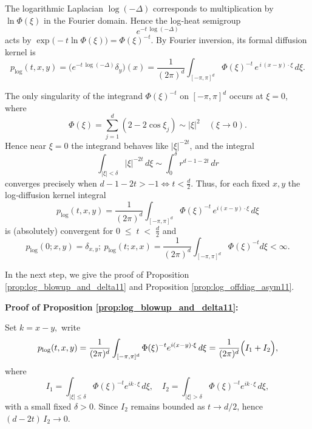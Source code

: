\documentclass[reqno,12pt]{amsart}
\numberwithin{equation}{section}
\begin{document}
The logarithmic Laplacian \(\log(-\Delta)\) corresponds to multiplication by \(\ln\Phi(\xi)\) in the Fourier domain.  Hence the log‐heat semigroup
\[
e^{-t\,\log(-\Delta)}
\]
acts by \(\exp\bigl(-t\ln\Phi(\xi)\bigr)=\Phi(\xi)^{-t}\).  By Fourier inversion, its formal diffusion kernel is
\[
p_{\log}(t,x,y)
=\bigl(e^{-t\,\log(-\Delta)}\delta_{y}\bigr)(x)
=\frac{1}{(2\pi)^d}
\int_{[-\pi,\pi]^d}
\Phi(\xi)^{-t}\,e^{\,i\,(x-y)\cdot\xi}\,d\xi.
\]

The only singularity of the integrand 
\(\Phi(\xi)^{-t}\) on \([-\pi,\pi]^d\) occurs at \(\xi=0\), where 
\[
\Phi(\xi)=\sum_{j=1}^d(2-2\cos\xi_j)\sim|\xi|^2
\quad(\xi\to0).
\]
Hence near \(\xi=0\) the integrand behaves like 
\(|\xi|^{-2t}\), and the integral 
\[
\int_{|\xi|<\delta}|\xi|^{-2t}\,d\xi
\sim \int_0^\delta r^{d-1-2t}\,dr
\]
converges precisely when $d-1-2t>-1\Longleftrightarrow
t<\frac d2.$
Thus, for each fixed \(x,y\) the log‐diffusion kernel integral
\[
p_{\log}(t,x,y)
=\frac1{(2\pi)^d}
\int_{[-\pi,\pi]^d}
\Phi(\xi)^{-t}\,e^{i(x-y)\cdot\xi}\,d\xi
\]
is (absolutely) convergent for $0\;\le\;t\;<\;\frac d2$
and 
\[p_{\log}(0;x,y)=\delta_{x,y};\: p_{\log}(t;x,x)=\frac1{(2\pi)^d}
\int_{[-\pi,\pi]^d}
\Phi(\xi)^{-t}d\xi<\infty.\]

In the next step, we give the proof of Proposition \ref{prop:log_blowup_and_delta11} and Proposition \ref{prop:log_offdiag_asym11}.


\vspace{1\baselineskip} 

\noindent \textbf{Proof of Proposition \ref{prop:log_blowup_and_delta11}:}

	Set $k=x-y,$ write
	\[
	p_{\log}(t,x,y)
	=\frac1{(2\pi)^d}\int_{[-\pi,\pi]^d}\Phi(\xi)^{-t}e^{i (x-y)\cdot\xi}\,d\xi
	=\frac1{(2\pi)^d}\Bigl(I_1+I_2\Bigr),
	\]
	where
	\[
	I_1=\int_{|\xi|\le\delta}\Phi(\xi)^{-t}e^{i k\cdot\xi}\,d\xi,
	\quad
	I_2=\int_{|\xi|>\delta}\Phi(\xi)^{-t}e^{i k\cdot\xi}\,d\xi,
	\]
	with a small fixed \(\delta>0\). Since \(I_2\) remains bounded as \(t\to d/2\), hence
	 \((d-2t)\,I_2\to0\).
	 
\end{document}
